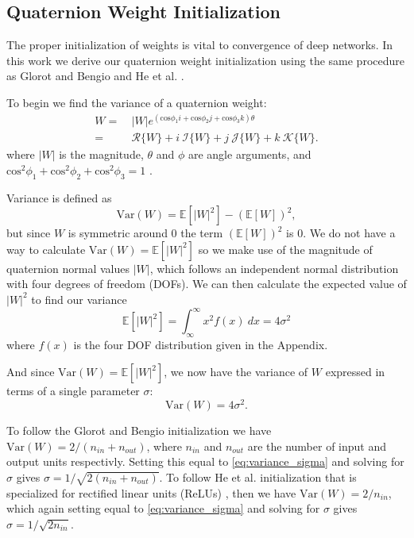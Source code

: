 \documentclass[conference]{IEEEtran}
\begin{document}
\subsection{Quaternion Weight Initialization}
The proper initialization of weights is vital to convergence of deep networks. 
In this work we derive our quaternion weight initialization using the same procedure as Glorot and Bengio \cite{glorot2010understanding} and He et al. \cite{he2015delving}.

To begin we find the variance of a quaternion weight:
\begin{align}
W = &~|W|e^{(\mbox{cos}\phi_1 \textit{i} + \mbox{cos}\phi_2 \textit{j} + \mbox{cos}\phi_3 \textit{k})\theta} \nonumber \\
= &~\mathscr{R}\{W\} + i~\mathscr{I}\{W\} + j~\mathscr{J}\{W\} + k~\mathscr{K}\{W\}.
\label{eq:quaternion_weight}
\end{align}
where $|W|$ is the magnitude, $\theta$ and $\phi$ are angle arguments, and $\mbox{cos}^2\phi_1 + \mbox{cos}^2\phi_2 + \mbox{cos}^2\phi_3 = 1$ \cite{turner2002}.

Variance is defined as
\begin{equation}
\mbox{Var}(W) = \mathbb{E}[|W|^2] - (\mathbb{E}[W])^2,
\label{eq:variance}
\end{equation}
but since $W$ is symmetric around 0 the term $(\mathbb{E}[W])^2$ is 0. 
We do not have a way to calculate $\mbox{Var}(W) = \mathbb{E}[|W|^2]$ so we make use of the magnitude of quaternion normal values $|W|$, which follows an independent normal distribution with four degrees of freedom (DOFs).
We can then calculate the expected value of $|W|^2$ to find our variance
\begin{equation}
\mathbb{E}[|W|^2] = \int_\infty^\infty x^2 f(x) ~dx = 4\sigma^2
\label{eq:expected}
\end{equation}
where $f(x)$ is the four DOF distribution given in the Appendix.

And since $\mbox{Var}(W) = \mathbb{E}[|W|^2]$, we now have the variance of $W$ expressed in terms of a single parameter $\sigma$:
\begin{equation}
\mbox{Var}(W) = 4\sigma^2.
\label{eq:variance_sigma}
\end{equation}

To follow the Glorot and Bengio \cite{glorot2010understanding} initialization we have $\mbox{Var}(W) = 2/(n_{in}+n_{out})$, where $n_{in}$ and $n_{out}$ are the number of input and output units respectivly. 
Setting this equal to \eqref{eq:variance_sigma} and solving for $\sigma$ gives $\sigma = 1/\sqrt{2(n_{in}+n_{out})}$.
To follow He et al. \cite{he2015delving} initialization that is specialized for rectified linear units (ReLUs) \cite{nair2010rectified}, then we have $\mbox{Var}(W) = 2/n_{in}$, which again setting equal to \eqref{eq:variance_sigma} and solving for $\sigma$ gives $\sigma = 1/\sqrt{2n_{in}}$.
\end{document}

